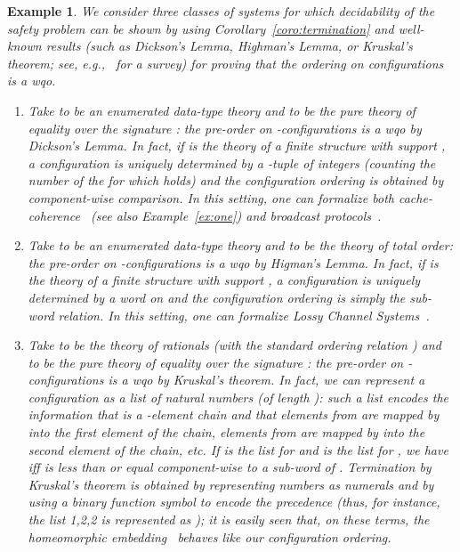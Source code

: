 \documentclass{LMCS}
\theoremstyle{plain}\newtheorem{assumption}[thm]{Assumption}
\theoremstyle{plain}\newtheorem{proposition}[thm]{Proposition}
\theoremstyle{plain}\newtheorem{property}[thm]{Property}
\theoremstyle{plain}\newtheorem{example}[thm]{Example}
\theoremstyle{plain}\newtheorem{claim}[thm]{Claim}
\theoremstyle{plain}\newtheorem{lemma}[thm]{Lemma}
\begin{document}
\begin{example}\em
  We consider three classes of systems for which decidability of the
  safety problem can be shown by using
  Corollary~\ref{coro:termination} and well-known results (such as
  Dickson's Lemma, Highman's Lemma, or Kruskal's theorem; see,
  e.g.,~\cite{gallier} for a survey) for proving that the ordering on
  configurations is a wqo.
  \begin{enumerate}[]
  \item Take  to be an enumerated data-type theory and  to
    be the pure theory of equality over the signature
    : the pre-order on -configurations is a wqo
    by Dickson's Lemma.  In fact, if  is the theory of a finite
    structure with support , a configuration is
    uniquely determined by a -tuple of integers (counting the
    number of the  for which  holds) and the
    configuration ordering is obtained by component-wise comparison.
    In this setting, one can formalize both
    cache-coherence~\cite{cav-delzanno} (see also
    Example~\ref{ex:one}) and broadcast protocols~\cite{bro1,bro2}.
  \item Take  to be an enumerated data-type theory and  to be
    the theory of total order: the pre-order on -configurations
    is a wqo by Higman's Lemma.  In fact, if  is the theory of a
    finite structure with support , a
    configuration is uniquely determined by a word on  and the configuration ordering is simply the sub-word
    relation.  In this setting, one can formalize Lossy Channel
    Systems~\cite{lossy-channels,lossy2}.
  \item Take  to be the theory of rationals (with the standard
    ordering relation ) and  to be the pure theory of equality
    over the signature : the pre-order on
    -configurations is a wqo by Kruskal's theorem.  In fact, we
    can represent a configuration  as a list  of natural numbers (of length ): such a list
    encodes the information that  is a -element chain and that
     elements from  are mapped by  into the first element
    of the chain,  elements from  are mapped by  into the
    second element of the chain, etc.  If  is the list for  and
     is the list for , we have  iff  is less than
    or equal component-wise to a sub-word of .  Termination by
    Kruskal's theorem is obtained by representing numbers as numerals
    and by using a binary function symbol  to encode the precedence
    (thus, for instance, the list 1,2,2 is represented as ); it is easily seen that, on these terms,
the homeomorphic embedding~\cite{BaaNi} behaves like our configuration
    ordering.
  \end{enumerate}
\end{example}
\end{document}
